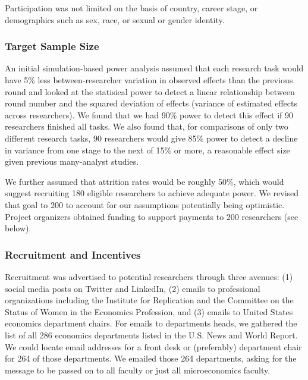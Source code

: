 \documentclass[
  letterpaper,
  DIV=11,
  numbers=noendperiod]{scrartcl}
\begin{document}
Participation was not limited on the basis of country, career stage, or
demographics such as sex, race, or sexual or gender identity.

\hypertarget{sec-target-sample}{%
\subsubsection{Target Sample Size}\label{sec-target-sample}}

An initial simulation-based power analysis assumed that each research
task would have 5\% less between-researcher variation in observed
effects than the previous round and looked at the statisical power to
detect a linear relationship between round number and the squared
deviation of effects (variance of estimated effects across researchers).
We found that we had 90\% power to detect this effect if 90 researchers
finished all tasks. We also found that, for comparisons of only two
different research tasks, 90 researchers would give 85\% power to detect
a decline in variance from one stage to the next of 15\% or more, a
reasonable effect size given previous many-analyst studies.

We further assumed that attrition rates would be roughly 50\%, which
would suggest recruiting 180 eligible researchers to achieve adequate
power. We revised that goal to 200 to account for our assumptions
potentially being optimistic. Project organizers obtained funding to
support payments to 200 researchers (see below).

\hypertarget{recruitment-and-incentives}{%
\subsubsection{Recruitment and
Incentives}\label{recruitment-and-incentives}}

Recruitment was advertised to potential researchers through three
avenues: (1) social media posts on Twitter and LinkedIn, (2) emails to
professional organizations including the Institute for Replication and
the Committee on the Status of Women in the Economics Profession, and
(3) emails to United States economics department chairs. For emails to
departments heads, we gathered the list of all 286 economics departments
listed in the U.S. News and World Report. We could locate email
addresses for a front desk or (preferably) department chair for 264 of
those departments. We emailed those 264 departments, asking for the
message to be passed on to all faculty or just all microeconomics
faculty.
\end{document}
